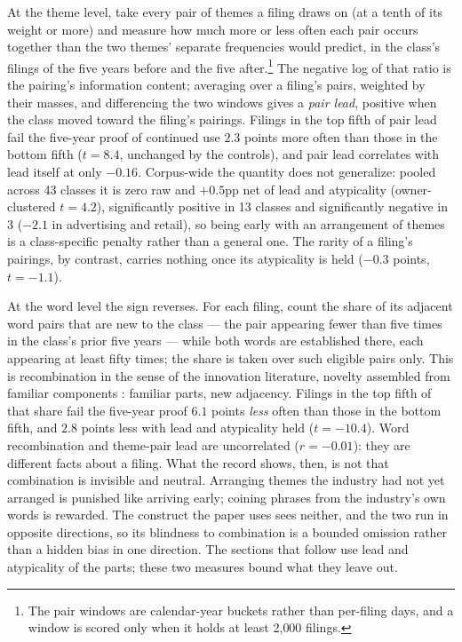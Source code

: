 At the theme level, take every pair of themes a filing draws on (at a tenth
of its weight or more) and measure how much more or less often each pair
occurs together than the two themes' separate frequencies would predict, in
the class's filings of the five years before and the five
after.\footnote{The pair windows are calendar-year buckets rather than
per-filing days, and a window is scored only when it holds at least
2{,}000 filings.} The
negative log of that ratio is the pairing's information content; averaging
over a filing's pairs, weighted by their masses, and differencing the two
windows gives a \emph{pair lead}, positive when the class moved toward the
filing's pairings. Filings in the top fifth of pair lead fail the
five-year proof of continued use $2.3$ points more often than those in the bottom fifth
($t = 8.4$, unchanged by the controls), and pair lead correlates with lead
itself at only $-0.16$. Corpus-wide the quantity does not generalize:
pooled across 43 classes it is zero raw and $+0.5$pp net of lead and
atypicality (owner-clustered $t = 4.2$), significantly positive in 13
classes and significantly negative in 3 ($-2.1$ in advertising and
retail), so being early with an arrangement of themes is a class-specific
penalty rather than a general one. The rarity of a filing's pairings, by
contrast, carries nothing once its atypicality is held ($-0.3$ points,
$t = -1.1$).

At the word level the sign reverses. For each filing, count the share of
its adjacent word pairs that are new to the class --- the pair appearing
fewer than five times in the class's prior five years --- while both words
are established there, each appearing at least fifty times; the share is
taken over such eligible pairs only. This is recombination in the sense of the innovation
literature, novelty assembled from familiar components
\citep{Fleming2001, Uzzi2013}: familiar parts, new adjacency. Filings in
the top fifth of that share fail the five-year proof $6.1$
points \emph{less} often than those in the bottom fifth, and $2.8$ points
less with lead and atypicality held ($t = -10.4$). Word recombination and
theme-pair lead are uncorrelated ($r = -0.01$): they are different facts
about a filing. What the record shows, then, is not that combination is
invisible and neutral. Arranging themes the industry had not yet arranged
is punished like arriving early; coining phrases from the industry's own
words is rewarded. The construct the paper uses sees neither, and the two
run in opposite directions, so its blindness to combination is a bounded
omission rather than a hidden bias in one direction. The sections that
follow use lead and atypicality of the parts; these two measures bound what
they leave out.

